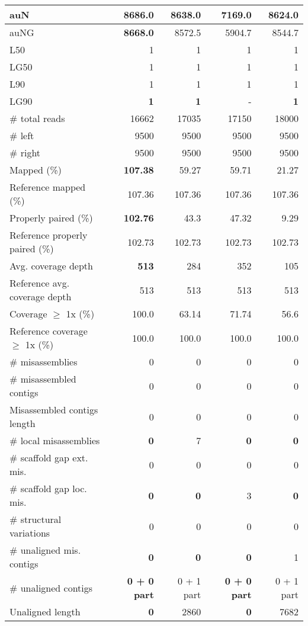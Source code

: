 \documentclass[12pt,a4paper]{article}
\begin{document}
\begin{table}[ht]
\begin{center}
\begin{tabular}{|l*{4}{|r}|}
auN & {\bf 8686.0} & 8638.0 & 7169.0 & 8624.0 \\ \hline
auNG & {\bf 8668.0} & 8572.5 & 5904.7 & 8544.7 \\ \hline
L50 & 1 & 1 & 1 & 1 \\ \hline
LG50 & 1 & 1 & 1 & 1 \\ \hline
L90 & 1 & 1 & 1 & 1 \\ \hline
LG90 & {\bf 1} & {\bf 1} & - & {\bf 1} \\ \hline
\# total reads & 16662 & 17035 & 17150 & 18000 \\ \hline
\# left & 9500 & 9500 & 9500 & 9500 \\ \hline
\# right & 9500 & 9500 & 9500 & 9500 \\ \hline
Mapped (\%) & {\bf 107.38} & 59.27 & 59.71 & 21.27 \\ \hline
Reference mapped (\%) & 107.36 & 107.36 & 107.36 & 107.36 \\ \hline
Properly paired (\%) & {\bf 102.76} & 43.3 & 47.32 & 9.29 \\ \hline
Reference properly paired (\%) & 102.73 & 102.73 & 102.73 & 102.73 \\ \hline
Avg. coverage depth & {\bf 513} & 284 & 352 & 105 \\ \hline
Reference avg. coverage depth & 513 & 513 & 513 & 513 \\ \hline
Coverage $\geq$ 1x (\%) & 100.0 & 63.14 & 71.74 & 56.6 \\ \hline
Reference coverage $\geq$ 1x (\%) & 100.0 & 100.0 & 100.0 & 100.0 \\ \hline
\# misassemblies & 0 & 0 & 0 & 0 \\ \hline
\# misassembled contigs & 0 & 0 & 0 & 0 \\ \hline
Misassembled contigs length & 0 & 0 & 0 & 0 \\ \hline
\# local misassemblies & {\bf 0} & 7 & {\bf 0} & {\bf 0} \\ \hline
\# scaffold gap ext. mis. & 0 & 0 & 0 & 0 \\ \hline
\# scaffold gap loc. mis. & {\bf 0} & {\bf 0} & 3 & {\bf 0} \\ \hline
\# structural variations & 0 & 0 & 0 & 0 \\ \hline
\# unaligned mis. contigs & {\bf 0} & {\bf 0} & {\bf 0} & 1 \\ \hline
\# unaligned contigs & {\bf 0 + 0 part} & 0 + 1 part & {\bf 0 + 0 part} & 0 + 1 part \\ \hline
Unaligned length & {\bf 0} & 2860 & {\bf 0} & 7682 \\ \hline

\end{tabular}
\end{center}
\end{table}
\end{document}

